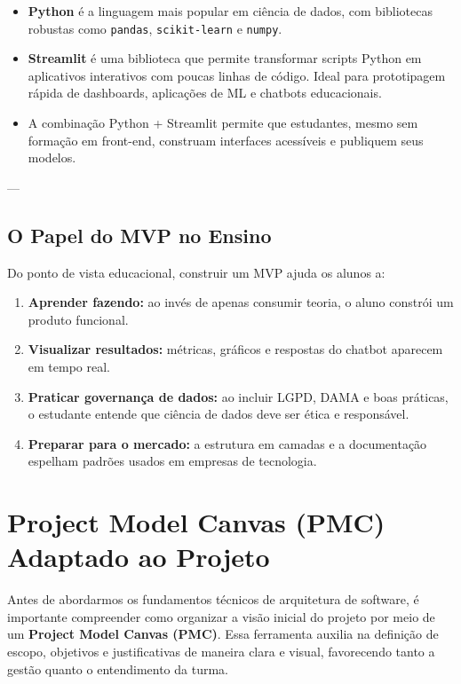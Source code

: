 \documentclass[12pt,a4paper]{article}
\begin{document}
\begin{itemize}
  \item \textbf{Python} é a linguagem mais popular em ciência de dados, com bibliotecas robustas como \texttt{pandas}, \texttt{scikit-learn} e \texttt{numpy}.
  \item \textbf{Streamlit} é uma biblioteca que permite transformar scripts Python em aplicativos interativos com poucas linhas de código. Ideal para prototipagem rápida de dashboards, aplicações de ML e chatbots educacionais.
  \item A combinação Python + Streamlit permite que estudantes, mesmo sem formação em front-end, construam interfaces acessíveis e publiquem seus modelos.
\end{itemize}

---

\subsection{O Papel do MVP no Ensino}

Do ponto de vista educacional, construir um MVP ajuda os alunos a:

\begin{enumerate}
  \item \textbf{Aprender fazendo:} ao invés de apenas consumir teoria, o aluno constrói um produto funcional.
  \item \textbf{Visualizar resultados:} métricas, gráficos e respostas do chatbot aparecem em tempo real.
  \item \textbf{Praticar governança de dados:} ao incluir LGPD, DAMA e boas práticas, o estudante entende que ciência de dados deve ser ética e responsável.
  \item \textbf{Preparar para o mercado:} a estrutura em camadas e a documentação espelham padrões usados em empresas de tecnologia.
\end{enumerate}

\clearpage

\section{Project Model Canvas (PMC) Adaptado ao Projeto}

Antes de abordarmos os fundamentos técnicos de arquitetura de software, é importante compreender como organizar a visão inicial do projeto por meio de um \textbf{Project Model Canvas (PMC)}. Essa ferramenta auxilia na definição de escopo, objetivos e justificativas de maneira clara e visual, favorecendo tanto a gestão quanto o entendimento da turma.
\end{document}
